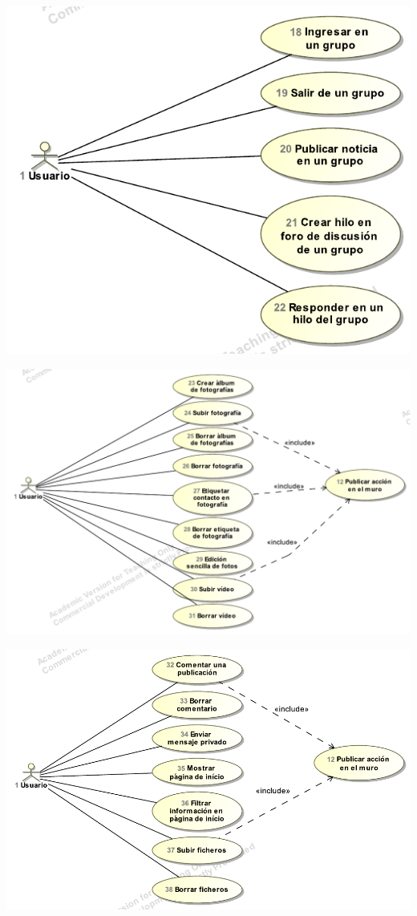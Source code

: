 \documentclass[12pt, a4paper, titlepage]{article}
\begin{document}
\begin{center}
\includegraphics[scale=0.95]{Imagenes/casosUso3}
\end{center}

\begin{center}
\includegraphics[width=\textwidth]{Imagenes/casosUso4}
\end{center}

\begin{center}
\includegraphics[width=\textwidth]{Imagenes/casosUso5}
\end{center}
\end{document}

